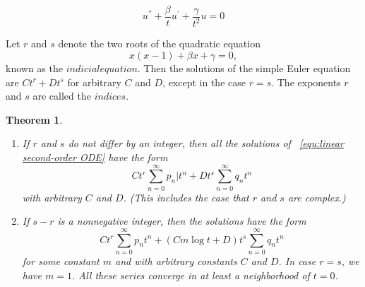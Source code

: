 \documentclass[hazy,blue,11pt]{elegantnote}
\begin{document}
\begin{definition}
\begin{equation}
    u^{''} + \frac{\beta}{t}u^{'} + \frac{\gamma}{t^2}u = 0 
\end{equation}   
\end{definition}
\begin{note}
    Let $r$ and $s$ denote the two roots of the quadratic equation
\begin{equation}
    x(x-1)+\beta x+\gamma=0,
\end{equation}
known as the $indicial equation$. Then the solutions of the simple Euler equation are $Ct^r+Dt^s$ for arbitrary $C$ and $D$, except in the case $r=s$. The exponents $r$ and $s$ are called the $indices$.
\end{note}

\newtheorem*{Theorem}{Theorem}
\begin{Theorem}
~\\
\begin{enumerate}
    \item If $r$ and $s$ do not differ by an integer, then all the solutions of ~\ref{equ:linear second-order ODE} have the form
\begin{equation}
    Ct^r\sum_{n=0}^\infty p_n\big|t^n+Dt^s\sum\limits_{n=0}^\infty q_n t^n
\end{equation}
with arbitrary $C$ and $D$. (This includes the case that $r$ and $s$ are complex.)

    \item If $s - r$ is a nonnegative integer, then the solutions have the form
\begin{equation}
    Ct^r\sum\limits_{n=0}^\infty p_n t^n+(Cm\log t+D)t^s\sum\limits_{n=0}^\infty q_n t^n
\end{equation}
for some constant $m$ and with arbitrary constants $C$ and $D$. In case $r = s$, we have $m = 1$. All these series converge in at least a neighborhood of $t = 0$.
\end{enumerate}
\end{Theorem}
\end{document}

